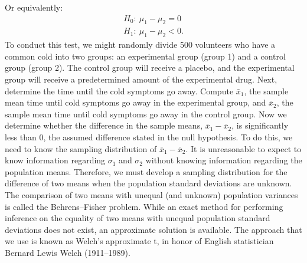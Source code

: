 \documentclass{report}
\begin{document}
    Or equivalently:
    \begin{align*}
        H_{0}:\ \mu_{1} - \mu_{2} = 0 \\
        H_{1}:\ \mu_{1} -\mu_{2} < 0
    .\end{align*}
    \bigbreak \noindent 
    To conduct this test, we might randomly divide 500 volunteers who have a common cold into two groups: an experimental group (group 1) and a control group (group 2). The control group will receive a placebo, and the experimental group will receive a predetermined amount of the experimental drug. Next, determine the time until the cold symptoms go away. Compute $\bar{x}_1$, the sample mean time until cold symptoms go away in the experimental group, and $\bar{x}_2$, the sample mean time until cold symptoms go away in the control group. Now we determine whether the difference in the sample means, $\bar{x}_1 - \bar{x}_2$, is significantly less than 0, the assumed difference stated in the null hypothesis. To do this, we need to know the sampling distribution of $\bar{x}_1 - \bar{x}_2$.
    \bigbreak \noindent 
    It is unreasonable to expect to know information regarding $\sigma_1$ and $\sigma_2$ without knowing information regarding the population means. Therefore, we must develop a sampling distribution for the difference of two means when the population standard deviations are unknown.
    \bigbreak \noindent 
    The comparison of two means with unequal (and unknown) population variances is called the Behrens--Fisher problem. While an exact method for performing inference on the equality of two means with unequal population standard deviations does not exist, an approximate solution is available. The approach that we use is known as Welch's approximate t, in honor of English statistician Bernard Lewis Welch (1911--1989).
\end{document}
